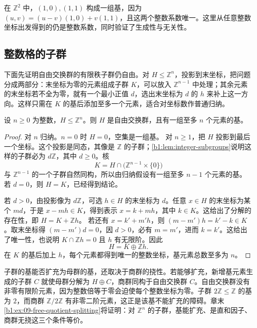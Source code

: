 \ProseParagraphBreak
在 \(\mathbb Z^2\) 中，\((1,0),(1,1)\) 构成一组基，因为 \((u,v)=(u-v)(1,0)+v(1,1)\)，且这两个整数系数唯一。这里从任意整数坐标出发得到的仍是整数系数，同时验证了生成性与无关性。

\subsection{整数格的子群}
\label{b1:subsec:0901:02}

下面先证明自由交换群的有限秩子群仍自由。对 \(H\leq\mathbb Z^n\)，投影到末坐标，把问题分成两部分：末坐标为零的元素组成子群 \(K\)，可以放入 \(\mathbb Z^{n-1}\) 中处理；其余元素的末坐标若不全为零，就有一个最小正值 \(d\)，选出末坐标为 \(d\) 的 \(h\) 来补上这一方向。这样只需在 \(K\) 的基后添加至多一个元素，适合对坐标数作普通归纳。

\begin{theorem}[有限秩自由交换群的子群]\label{b1:thm:finite-rank-free-abelian-subgroup}
	设 \(n\geq0\) 为整数，\(H\leq\mathbb Z^n\)。则 \(H\) 是自由交换群，且有一组至多 \(n\) 个元素的基。
\end{theorem}

\begin{proof}
	对 \(n\) 归纳。\(n=0\) 时 \(H=0\)，空集是一组基。 对 \(n\ge1\)，把 \(H\) 投影到最后一个坐标。这个投影是同态，其像是 \(\mathbb Z\) 的子群；\cref{b1:lem:integer-subgroups}说明这样的子群必为 \(d\mathbb Z\)，其中 \(d\ge0\)。核
	\[
		K=H\cap\bigl(\mathbb Z^{n-1}\times\{0\}\bigr)
	\]
	与 \(\mathbb Z^{n-1}\) 的一个子群自然同构，所以由归纳假设有一组至多 \(n-1\) 个元素的基。若 \(d=0\)，则 \(H=K\)，已经得到结论。

	若 \(d>0\)，由投影像为 \(d\mathbb Z\)，可选 \(h\in H\) 的末坐标为 \(d\)。任意 \(x\in H\) 的末坐标为某个 \(md\)，于是 \(x-mh\in K\)，得到表示 \(x=k+mh\)，其中 \(k\in K\)。这给出了分解的存在性，即 \(H=K+\mathbb Zh\)。 若还有 \(x=k'+m'h\)，则 \((m-m')h=k'-k\in K\)。取末坐标得 \((m-m')d=0\)，因 \(d>0\)，必有 \(m=m'\)，进而 \(k=k'\)。这给出了唯一性，也说明 \(K\cap\mathbb Zh=0\) 且 \(h\) 有无限阶。因此
	\[
		H=K\oplus\mathbb Zh.
	\]
	在 \(K\) 的基后加上 \(h\)，每个元素都得到唯一的整数坐标，基元素总数至多为 \(n\)。
\end{proof}

子群的基能否扩充为母群的基，还取决于商群的挠性。若能够扩充，新增基元素生成的子群 \(C\) 就使母群分解为 \(H\oplus C\)，商群同构于自由交换群 \(C\)。自由交换群没有非零有限阶元素，因为整数倍等于零会迫使每个整数坐标为零。子群 \(2\mathbb Z\le\mathbb Z\) 的基为 \(2\)，而商群 \(\mathbb Z/2\mathbb Z\) 有非零二阶元素，这正是该基不能扩充的障碍。章末\cref{b1:ex:09-free-quotient-splitting}将证明：对 \(\mathbb Z^n\) 的子群，基能扩充、是直和因子、商群无挠这三个条件等价。

